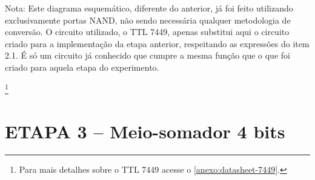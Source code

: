 		Nota: Este diagrama esquemático, diferente do anterior, já foi feito
		utilizando exclusivamente portas NAND, não sendo necessária qualquer metodologia de conversão.
		O circuito utilizado, o TTL 7449, apenas substitui aqui o circuito criado para a implementação
		da etapa anterior, respeitando as expressões do item 2.1. É só um circuito já conhecido que
		cumpre a mesma função que o que foi criado para aquela etapa do experimento.

		\footnote{Para mais detalhes sobre o TTL 7449 acesse o \autoref{anexo:datasheet-7449}.}
	\section{ETAPA 3 – Meio-somador 4 bits}


